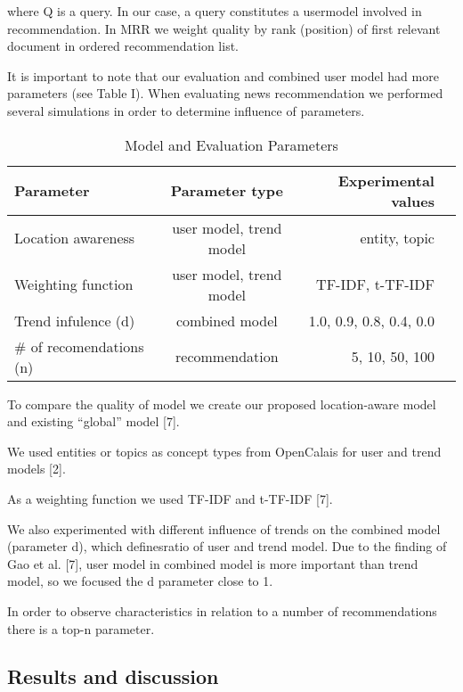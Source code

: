 \documentclass[a4, conference]{IEEEtran}
\begin{document}
where Q is  a  query.  In  our  case,  a  query  constitutes  a  usermodel  involved  in  recommendation.  In MRR  we  weight quality  by  rank  (position)  of  first  relevant  document  in ordered recommendation list.

 It  is  important  to  note  that  our  evaluation  and  combined user   model   had   more   parameters   (see   Table   I).   When evaluating   news   recommendation   we   performed  several simulations in order to determine influence of parameters.  

\begin{table}
\centering
\caption{Model and Evaluation Parameters}
\label{tabulka1}
	\begin{tabular}{|l|c|r|p{3cm}|}
	\hline
		\textbf{Parameter} & \textbf{Parameter type} & \textbf{Experimental values}\\
	\hline
		Location awareness	& user model, trend model & entity, topic\\
	\hline
		Weighting function & user model, trend model & TF-IDF, t-TF-IDF\\
	\hline
		Trend infulence (d) & combined model & 1.0, 0.9, 0.8, 0.4, 0.0\\
	\hline
		\# of recomendations (n) & recommendation & 5, 10, 50, 100\\
	\hline
	\end{tabular}
\end{table}

To compare the quality of model we create our proposed location-aware model and existing “global” model [7]. 

We   used   entities   or   topics   as   concept   types   from OpenCalais for user and trend models [2]. 

 As  a  weighting  function  we  used  TF-IDF  and  t-TF-IDF [7]. 

 We  also  experimented  with  different  influence  of  trends on the combined model (parameter d), which definesratio of user  and  trend  model.  Due  to  the  finding  of  Gao  et al.  [7], user model in combined model is more important than trend model, so we focused the d parameter close to 1. 

In order to observe characteristics in relation to a number of recommendations there is a top-n parameter.  

\subsection{Results and discussion}
\end{document}
